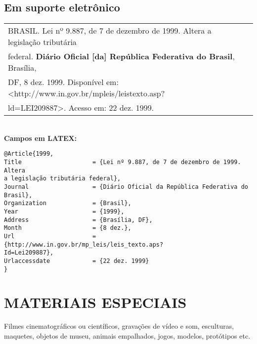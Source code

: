 \subsection{Em suporte eletrônico}
	
\begin{tabular}{|l|c|} \hline
	BRASIL. Lei nº 9.887, de 7 de dezembro de 1999. Altera a legislação tributária \\
	federal. \textbf{Diário Oficial [da] República Federativa do Brasil}, Brasília, \\
	DF, 8 dez. 1999. Disponível em: <http://www.in.gov.br/mpleis/leistexto.asp?       \\
	ld=LEI209887>. Acesso em: 22 dez. 1999.                                            
	                                                                                   \\\hline
\end{tabular} \\
	
\textbf{Campos em LATEX:} 
	
\begingroup
\fontsize{10pt}{12pt}\selectfont
\begin{verbatim}
@Article{1999,
Title                    = {Lei nº 9.887, de 7 de dezembro de 1999. Altera 
a legislação tributária federal},
Journal                  = {Diário Oficial da República Federativa do 
Brasil},
Organization             = {Brasil},
Year                     = {1999},
Address                  = {Brasília, DF},
Month                    = {8 dez.},
Url                      = {http://www.in.gov.br/mp_leis/leis_texto.aps?
Id=Lei209887},
Urlaccessdate            = {22 dez. 1999}
}
\end{verbatim}
\endgroup
	
\section{MATERIAIS ESPECIAIS}
	
Filmes cinematográficos ou científicos, gravações de vídeo e som,
esculturas, maquetes, objetos de museu, animais empalhados, jogos,
modelos, protótipos etc. \\
	
